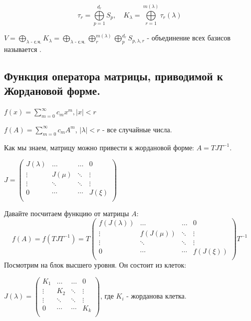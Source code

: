 $$\tau_r = \bigoplus\limits_{p = 1}^{d_r}S_p, \quad K_{\lambda} = \bigoplus\limits_{r = 1}^{m(\lambda)}\tau_r(\lambda)$$

$V = \bigoplus\limits_{\lambda\text{ - с.ч.}} K_\lambda = \bigoplus\limits_{\lambda\text{ - с.ч.}}\bigoplus\limits_{r}^{m(\lambda)}\bigoplus\limits_{p}^{d_r}S_{p,\lambda,r}$ - объединение всех базисов называется .

\subsection{Функция оператора матрицы, приводимой к Жордановой форме.}

$f(x) = \sum\limits_{m = 0}^{\infty}c_m x^m, |x|< r$

$f(A) = \sum\limits_{m=0}^{\infty}c_m A^m$, $|\lambda|< r$ - все случайные числа.

Как мы знаем, матрицу можно привести к жордановой форме: $A = TJT^{-1}$.

$J = \begin{pmatrix}
    J(\lambda) & \ldots & \ldots & 0 \\
    \vdots & J(\mu) & \ddots & \vdots\\
    \vdots & \ddots & \ddots & \vdots\\
    0 & \cdots & \cdots & J(\xi)\\
\end{pmatrix}$

Давайте посчитаем функцию от матрицы $A$:
$$f(A) = f(TJT^{-1}) = T \begin{pmatrix}
    f(J(\lambda)) & \ldots & \ldots & 0 \\
    \vdots & f(J(\mu)) & \ddots & \vdots\\
    \vdots & \ddots & \ddots & \vdots\\
    0 & \cdots & \cdots & f(J(\xi))\\
\end{pmatrix} T^{-1}$$
Посмотрим на блок высшего уровня. Он состоит из клеток:

$J(\lambda ) = \begin{pmatrix}
    K_1 & \ldots & \ldots & 0 \\
    \vdots & K_2 & \ddots & \vdots\\
    \vdots & \ddots & \ddots & \vdots\\
    0 & \cdots & \cdots & K_k\\
\end{pmatrix}$, где $K_i$ - жорданова клетка.

